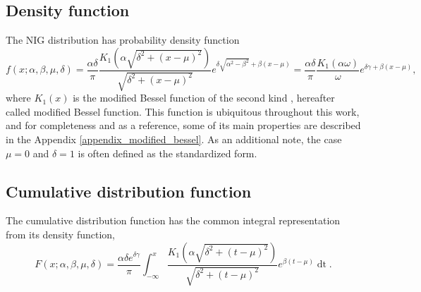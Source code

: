 \documentclass[10pt,a4paper,oneside]{article}
\numberwithin{equation}{section}
\begin{document}

\subsection{Density function}
The NIG distribution has probability density function
\begin{equation}
f(x; \alpha, \beta, \mu, \delta) = \frac{\alpha \delta}{\pi} \frac{K_1\left(\alpha\sqrt{\delta^2 + (x-\mu)^2}\right)}{\sqrt{\delta^2 + (x-\mu)^2}} e^{\delta \sqrt{\alpha^2 - \beta^2} + \beta(x-\mu)} = \frac{\alpha \delta}{\pi} \frac{K_1\left(\alpha\omega\right)}{\omega} e^{\delta \gamma + \beta(x-\mu)},
\end{equation}
where $K_1(x)$ is the modified Bessel function of the second kind \cite[\S 10]{NIST:DLMF},  hereafter called modified Bessel function. This function is ubiquitous throughout this work, and for completeness and as a reference, some of its main properties are described in the Appendix \ref{appendix_modified_bessel}. As an additional note, the case $\mu = 0$ and $\delta = 1$ is often defined as the standardized form.

\subsection{Cumulative distribution function}\label{properties_cdf}
The cumulative distribution function has the common integral representation from its density function,
\begin{equation}\label{integral_k1}
F(x; \alpha, \beta, \mu, \delta) = \frac{\alpha \delta e^{\delta \gamma}}{\pi} \int_{-\infty}^{x} \frac{K_1\left(\alpha\sqrt{\delta^2 + (t-\mu)^2}\right)}{\sqrt{\delta^2 + (t-\mu)^2}} e^{\beta(t-\mu)} \mathop{dt}.
\end{equation}
\end{document}
